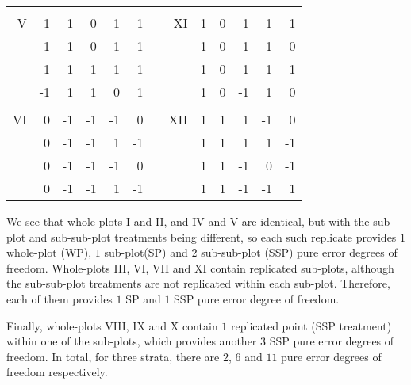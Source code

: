 \begin{table}[h]
{\begin{tabular}{r|rr|r|rr|rr|rr|r|rr|}
    &    &    &    &    &    & &      &   &    &    &    &    \\ \cline{2-6} \cline{9-13}
V   & -1 & 1  & 0  & -1 & 1  & & XI   & 1 & 0  & -1 & -1 & -1 \\
    & -1 & 1  & 0  & 1  & -1 & &      & 1 & 0  & -1 & 1  & 0  \\\cline{4-6} \cline{11-13}
    & -1 & 1  & 1  & -1 & -1 & &      & 1 & 0  & -1 & -1 & -1 \\
    & -1 & 1  & 1  & 0  & 1  & &      & 1 & 0  & -1 & 1  & 0  \\ \cline{2-6} \cline{9-13}
    &    &    &    &    &    & &      &   &    &    &    &    \\ \cline{2-6} \cline{9-13}
VI  & 0  & -1 & -1 & -1 & 0  & & XII  & 1 & 1  & 1  & -1 & 0  \\
    & 0  & -1 & -1 & 1  & -1 & &      & 1 & 1  & 1  & 1  & -1 \\ \cline{4-6} \cline{11-13}
    & 0  & -1 & -1 & -1 & 0  & &      & 1 & 1  & -1 & 0  & -1 \\
    & 0  & -1 & -1 & 1  & -1 & &      & 1 & 1  & -1 & -1 & 1  \\ \cline{2-6} \cline{9-13}
\end{tabular}
}
\end{table}    

We see that whole-plots I and II, and IV and V are identical, but with the sub-plot and sub-sub-plot treatments being different, so each such replicate provides $1$ whole-plot (WP), $1$ sub-plot(SP) and $2$ sub-sub-plot (SSP) pure error degrees of freedom. Whole-plots III, VI, VII and XI contain replicated sub-plots, although the sub-sub-plot treatments are not replicated within each sub-plot. Therefore, each of them provides $1$ SP and $1$ SSP pure error degree of freedom. 

Finally, whole-plots VIII, IX and X contain $1$ replicated point (SSP treatment) within one of the sub-plots, which provides another $3$ SSP pure error degrees of freedom. In total, for three strata, there are $2$, $6$ and $11$ pure error degrees of freedom respectively.